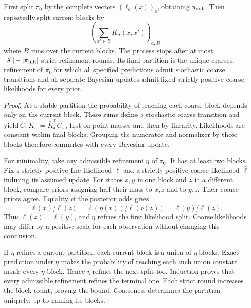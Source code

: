 \begin{Coretheorem}\label{Core:r:joint-refinement}
First split $\pi_0$ by the complete vectors $(\ell_o(x))_o$, obtaining $\pi_{\rm init}$. Then repeatedly split current blocks by
\[
 \left(\sum_{x'\in B}K_a(x,x')\right)_{a,B},
\]
where $B$ runs over the current blocks. The process stops after at most $|X|-|\pi_{\rm init}|$ strict refinement rounds. Its final partition is the unique coarsest refinement of $\pi_0$ for which all specified predictions admit stochastic coarse transitions and all separate Bayesian updates admit fixed strictly positive coarse likelihoods for every prior.
\end{Coretheorem}
\begin{proof}
At a stable partition the probability of reaching each coarse block depends only on the current block. These sums define a stochastic coarse transition and yield $C_\pi K_a^\top=\bar K_a^\top C_\pi$, first on point masses and then by linearity. Likelihoods are constant within final blocks. Grouping the numerator and normalizer by those blocks therefore commutes with every Bayesian update.

For minimality, take any admissible refinement $\eta$ of $\pi_0$. It has at least two blocks. Fix a strictly positive fine likelihood $\ell$ and a strictly positive coarse likelihood $\bar\ell$ inducing its assumed update. For states $x,y$ in one block and $z$ in a different block, compare priors assigning half their mass to $x,z$ and to $y,z$. Their coarse priors agree. Equality of the posterior odds gives
\[
 \ell(x)/\ell(z)=\bar\ell(\eta(x))/\bar\ell(\eta(z))=\ell(y)/\ell(z).
\]
Thus $\ell(x)=\ell(y)$, and $\eta$ refines the first likelihood split. Coarse likelihoods may differ by a positive scale for each observation without changing this conclusion.

If $\eta$ refines a current partition, each current block is a union of $\eta$ blocks. Exact prediction under $\eta$ makes the probability of reaching each such union constant inside every $\eta$ block. Hence $\eta$ refines the next split too. Induction proves that every admissible refinement refines the terminal one. Each strict round increases the block count, proving the bound. Coarseness determines the partition uniquely, up to naming its blocks.
\end{proof}

